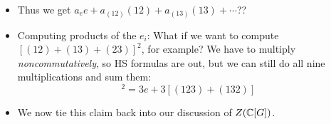 \documentclass[../notes.tex]{subfiles}
\begin{document}
\begin{itemize}
\begin{proof}
        \begin{equation*}
            \sum_{g\in G}a_{x^{-1}gx}g = \sum_{g\in G}a_gxgx^{-1}
            = xax^{-1}
            = a
            = \sum_{g\in G}a_gg
        \end{equation*}
        Comparing like terms in the above equality, we can learn that for all $x\in G$, we have $a_{x^{-1}gx}=a_g$. In other words, all of the $a_g$'s for $g$'s in the same conjugacy class are equal. Therefore, $a$ is of the form $a=\sum_{i=1}^ka_{g_i}e_i$ for $g_i\in C_i$.
    \end{proof}
    \item Thus we get $a_ee+a_{(12)}(12)+a_{(13)}(13)+\cdots$??
    \item Computing products of the $e_i$: What if we want to compute $[(12)+(13)+(23)]^2$, for example? We have to multiply \emph{noncommutatively}, so HS formulas are out, but we can still do all nine multiplications and sum them:
    \begin{equation*}
        [(12)+(13)+(23)]^2 = 3e+3[(123)+(132)]
    \end{equation*}
    \item We now tie this claim back into our discussion of $Z(\mathbb{C}[G])$.
    \begin{itemize}

\end{itemize}
\end{itemize}
\end{document}
